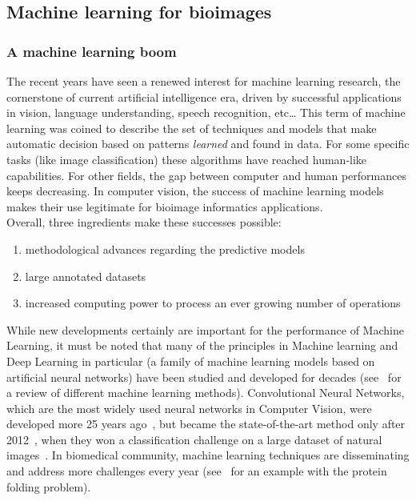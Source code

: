 \subsection{Machine learning for bioimages}
\label{subsec:intro_ml_tools}

\subsubsection{A machine learning boom}

The recent years have seen a renewed interest for machine learning research, the cornerstone of current artificial intelligence era, driven by successful applications in vision, language understanding, speech recognition, etc\dots
This term of machine learning was coined to describe the set of techniques and models that make automatic decision based on patterns \emph{learned} and found in data.
For some specific tasks (like image classification) these algorithms have reached human-like capabilities.
For other fields, the gap between computer and human performances keeps decreasing.
In computer vision, the success of machine learning models makes their use legitimate for bioimage informatics applications.\\

\noindent
Overall, three ingredients make these successes possible:
\begin{enumerate}
	\setlength\itemsep{0.1em}
	\item methodological advances regarding the predictive models
	\item large annotated datasets
	\item increased computing power to process an ever growing number of operations
\end{enumerate}

\noindent
While new developments certainly are important for the performance of Machine Learning, it must be noted that many 
of the principles in Machine learning and Deep Learning in particular (a family of machine learning models based on artificial neural networks) have been studied and developed for decades (see~\cite{Bishop_2006, Tibshirani_2009} for a review of different machine learning methods).
Convolutional Neural Networks, which are the most widely used neural networks in Computer Vision, were developed more 25 years ago~\cite{LeCun1998}, but became the state-of-the-art method only after 2012~\cite{alexnet_2012}, when they won a classification challenge on a large dataset of natural images~\cite{Deng_2009}. 
In biomedical community, machine learning techniques are disseminating and address more challenges every year (see~\cite{jumper_highly_2021} for an example with the protein folding problem).

